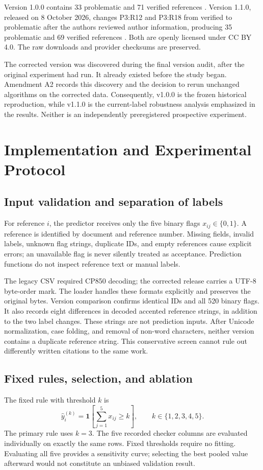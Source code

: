 \documentclass[acmsmall,screen,nonacm]{acmart}
\begin{document}
Version 1.0.0 contains 33 problematic and 71 verified references \citep{datasetv1}. Version 1.1.0, released on 8 October 2026, changes P3:R12 and P3:R18 from verified to problematic after the authors reviewed author information, producing 35 problematic and 69 verified references \citep{datasetv11}. Both are openly licensed under CC BY 4.0. The raw downloads and provider checksums are preserved.

The corrected version was discovered during the final version audit, after the original experiment had run. It already existed before the study began. Amendment A2 records this discovery and the decision to rerun unchanged algorithms on the corrected data. Consequently, v1.0.0 is the frozen historical reproduction, while v1.1.0 is the current-label robustness analysis emphasized in the results. Neither is an independently preregistered prospective experiment.

\section{Implementation and Experimental Protocol}
\subsection{Input validation and separation of labels}
For reference $i$, the predictor receives only the five binary flags $x_{ij}\in\{0,1\}$. A reference is identified by document and reference number. Missing fields, invalid labels, unknown flag strings, duplicate IDs, and empty references cause explicit errors; an unavailable flag is never silently treated as acceptance. Prediction functions do not inspect reference text or manual labels.

The legacy CSV required CP850 decoding; the corrected release carries a UTF-8 byte-order mark. The loader handles these formats explicitly and preserves the original bytes. Version comparison confirms identical IDs and all 520 binary flags. It also records eight differences in decoded accented reference strings, in addition to the two label changes. These strings are not prediction inputs. After Unicode normalization, case folding, and removal of non-word characters, neither version contains a duplicate reference string. This conservative screen cannot rule out differently written citations to the same work.

\subsection{Fixed rules, selection, and ablation}
The fixed rule with threshold $k$ is
\begin{equation}
 \widehat y_i^{(k)}=\mathbf{1}\!\left[\sum_{j=1}^{5}x_{ij}\geq k\right],\qquad k\in\{1,2,3,4,5\}.
\end{equation}
The primary rule uses $k=3$. The five recorded checker columns are evaluated individually on exactly the same rows. Fixed thresholds require no fitting. Evaluating all five provides a sensitivity curve; selecting the best pooled value afterward would not constitute an unbiased validation result.
\end{document}

